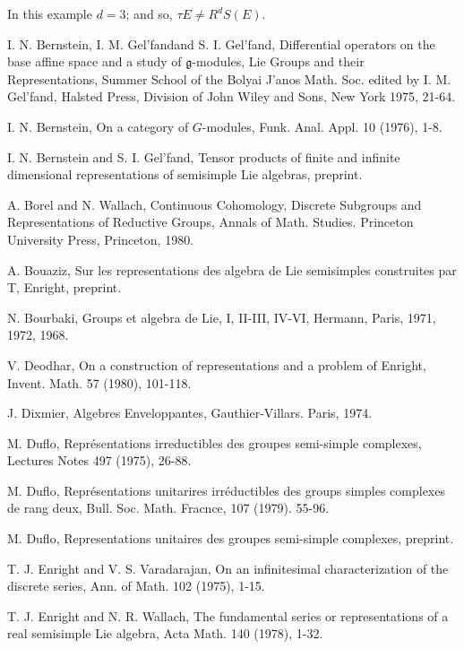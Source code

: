 In this example $d=3$; and so, $\tau E \neq R^d S(E)$. 

\begin{thebibliography}{99}
 I. N. Bernstein, I. M. Gel'fand\pageoriginale and
  S. I. Gel'fand, Differential operators on the base affine space and
  a study of $\mathfrak{g}$-modules, Lie Groups and their
  Representations, Summer School of the Bolyai J'anos
  Math. Soc. edited by I. M. Gel'fand, Halsted Press, Division of John
  Wiley and Sons, New York 1975, 21-64. 

 I. N. Bernstein, On a category of $G$-modules,
  Funk. Anal. Appl. 10 (1976), 1-8. 

 I. N. Bernstein and S. I. Gel'fand, Tensor products of
  finite and infinite dimensional representations of semisimple Lie
  algebras, preprint.

 A. Borel and N. Wallach, Continuous Cohomology,
  Discrete Subgroups and Representations of Reductive Groups, Annals
  of Math. Studies. Princeton University Press, Princeton, 1980. 

 A. Bouaziz, Sur les representations des algebra de Lie
  semisimples construites par T, Enright, preprint. 

 N. Bourbaki, Groups et algebra de Lie, I, II-III,
  IV-VI, Hermann, Paris, 1971, 1972, 1968.

 V. Deodhar, On a construction of representations and a
  problem of Enright, Invent. Math. 57 (1980), 101-118. 

 J. Dixmier, Algebres Enveloppantes,
  Gauthier-Villars. Paris, 1974. 

 M. Duflo, Repr\'esentations irreductibles des groupes
  semi-simple complexes, Lectures Notes 497 (1975), 26-88. 

 M. Duflo, Repr\'esentations unitarires irr\'eductibles
  des groups simples complexes de rang deux, Bull. Soc. Math. Fracnce,
  107 (1979). 55-96. 

  M. Duflo, Representations unitaires des groupes
  semi-simple complexes, preprint. 

 T. J. Enright and V. S. Varadarajan, On an
  infinitesimal characterization of the discrete series, Ann. of
  Math. 102 (1975), 1-15.

 T. J. Enright and N. R. Wallach, The fundamental
  series or representations of a real semisimple Lie algebra, Acta
  Math. 140 (1978), 1-32. 



\end{thebibliography}
